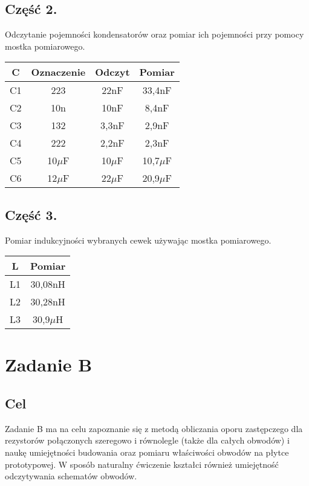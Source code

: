 \documentclass[polish,a4paper]{article}
\begin{document}
\subsection{Część 2.}
Odczytanie pojemności kondensatorów oraz pomiar ich pojemności przy pomocy mostka pomiarowego.\\

\begin{center}
\begin{tabular}{|c|c|c|c|}
\hline
\textbf{C} & \textbf{Oznaczenie} & \textbf{Odczyt} & \textbf{Pomiar}\\
\hline
C1 & 223 & 22nF & 33,4nF\\
\hline
C2 & 10n & 10nF & 8,4nF\\
\hline
C3 & 132 & 3,3nF & 2,9nF\\
\hline
C4 & 222 & 2,2nF & 2,3nF\\
\hline
C5 & 10$\mu$F & 10$\mu$F & 10,7$\mu$F\\
\hline
C6 & 12$\mu$F & 22$\mu$F & 20,9$\mu$F\\
\hline
\end{tabular}
\end{center}

\subsection{Część 3.}
Pomiar indukcyjności wybranych cewek używając mostka pomiarowego.\\

\begin{center}
\begin{tabular}{|c|c|}
\hline
\textbf{L} & \textbf{Pomiar}\\
\hline
L1 & 30,08nH\\
\hline
L2 & 30,28nH\\
\hline
L3 & 30,9$\mu$H\\
\hline
\end{tabular}
\end{center}

\section{Zadanie B}

\subsection*{Cel}

Zadanie B ma na celu zapoznanie się z metodą obliczania oporu zastępczego dla rezystorów połączonych szeregowo i równolegle (także dla całych obwodów) i naukę umiejętności budowania oraz pomiaru właściwości obwodów na płytce prototypowej. W sposób naturalny ćwiczenie kształci również umiejętność odczytywania schematów obwodów.\\
\end{document}
